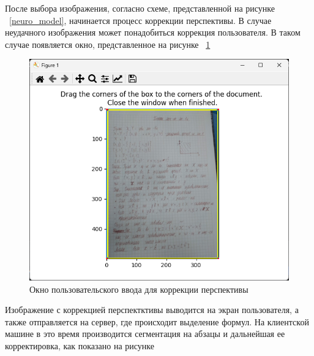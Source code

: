 После выбора изображения, согласно схеме, представленной на рисунке ~\ref{neuro_model}, начинается процесс коррекции перспективы. В случае неудачного изображения может понадобиться коррекция пользователя. В таком случае появляется окно, представленное на рисунке ~\ref{perspective_correction_window}

\begin{figure}
    \includegraphics[]{img/app/perspective_correction_window.png}
    \caption{Окно пользовательского ввода для коррекции перспективы}
    \label{perspective_correction_window}
\end{figure}


Изображение с коррекцией перспектктивы выводится на экран пользователя, а также отправляется на сервер, где происходит выделение формул. На клиентской машине в это время производится сегментация на абзацы и дальнейшая ее корректировка, как показано на рисунке